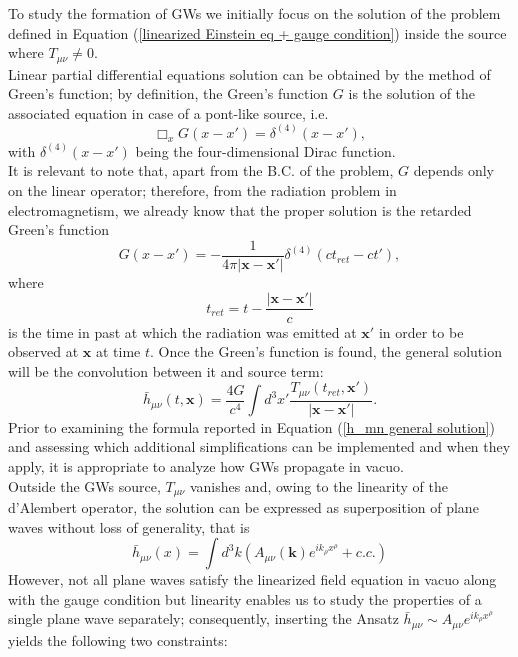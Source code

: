 \documentclass[12pt,twoside,openany]{book}
\begin{document}
To study the formation of GWs we initially focus on the solution of the problem defined in Equation (\ref{linearized Einstein eq + gauge condition}) inside the source where $T_{\mu\nu}\ne 0$.\\Linear partial differential equations solution can be obtained by the method of Green's function; by definition, the Green's function $G$ is the solution of the associated equation in case of a pont-like source, i.e.
\begin{equation}\label{Green equation}
    \Box_x G(x-x') = \delta^{(4)}(x-x'),
\end{equation}
with $\delta^{(4)}(x-x')$ being the four-dimensional Dirac function.\\It is relevant to note that, apart from the B.C. of the problem, $G$ depends only on the linear operator; therefore, from the radiation problem in electromagnetism, we already know that the proper solution is the retarded Green's function 
\begin{equation}\label{retarded Green function}
    G(x-x')=-\frac{1}{4\pi |\mathbf{x}-\mathbf{x'}|}\delta^{(4)}(ct_{ret}-ct'),
\end{equation}
where 
\begin{equation}\label{retarded time def}
    t_{ret}=t-\frac{|\mathbf{x}-\mathbf{x'}|}{c}
\end{equation}
is the time in past at which the radiation was emitted at $\mathbf{x'}$ in order to be observed at $\mathbf{x}$ at time $t$. Once the Green's function is found, the general solution will be the convolution between it and source term:
\begin{equation}\label{h_mn general solution}
    \bar{h}_{\mu\nu}(t,\mathbf{x})=\frac{4G}{c^4}\int d^3x'\frac{T_{\mu\nu}(t_{ret},\mathbf{x'})}{|\mathbf{x}-\mathbf{x'}|}.
\end{equation}
Prior to examining the formula reported in Equation (\ref{h_mn general solution}) and assessing which additional simplifications can be implemented and when they apply, it is appropriate to analyze how GWs propagate in vacuo.\\Outside the GWs source, $T_{\mu\nu}$ vanishes and, owing to the linearity of the d’Alembert operator, the solution can be expressed as superposition of plane waves without loss of generality, that is
\begin{equation}
    \bar{h}_{\mu\nu}(x)=\int d^3k (A_{\mu\nu}(\mathbf{k})e^{ik_\rho x^\rho}+c.c.)
\end{equation}
However, not all plane waves satisfy the linearized field equation in vacuo along with the gauge condition but linearity enables us to study the properties of a single plane wave separately; consequently, inserting the Ansatz $\bar{h}_{\mu\nu}\sim A_{\mu\nu}e^{ik_\rho x^\rho}$ yields the following two constraints:
\end{document}
